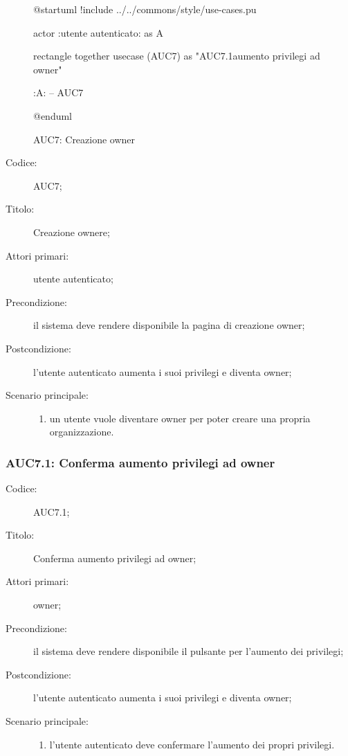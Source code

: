 \documentclass[../../../analisi-dei-requisiti.tex]{subfiles}
\begin{document}
\begin{figure}[H]
  \centering
  \begin{plantuml}
  @startuml
  !include ../../commons/style/use-cases.pu

  actor :utente autenticato: as A

  rectangle {
    together {
      usecase (AUC7) as "AUC7.1\nConferma aumento privilegi ad owner"
    }
  }

  :A: -- AUC7

  @enduml
  \end{plantuml}
  \caption{AUC7: Creazione owner}%
  \label{fig:AUC7}
\end{figure}

\begin{description}
  \item[Codice:] AUC7;
  \item[Titolo:] Creazione ownere;
  \item[Attori primari:] utente autenticato;
  \item[Precondizione:] il sistema deve rendere disponibile la pagina di creazione owner;
  \item[Postcondizione:] l'utente autenticato aumenta i suoi privilegi e diventa owner;
  \item[Scenario principale:]
  \begin{enumerate}
    \item un utente vuole diventare owner per poter creare una propria organizzazione.
  \end{enumerate}
\end{description}

\subsubsection{AUC7.1: Conferma aumento privilegi ad owner}%
\label{subs:AUC7.1}
\begin{description}
  \item[Codice:] AUC7.1;
  \item[Titolo:] Conferma aumento privilegi ad owner;
  \item[Attori primari:] owner;
  \item[Precondizione:] il sistema deve rendere disponibile il pulsante per l'aumento dei privilegi;
  \item[Postcondizione:] l'utente autenticato aumenta i suoi privilegi e diventa owner;
  \item[Scenario principale:]
  \begin{enumerate}
    \item l'utente autenticato deve confermare l'aumento dei propri privilegi.
  \end{enumerate}
\end{description}
\end{document}
